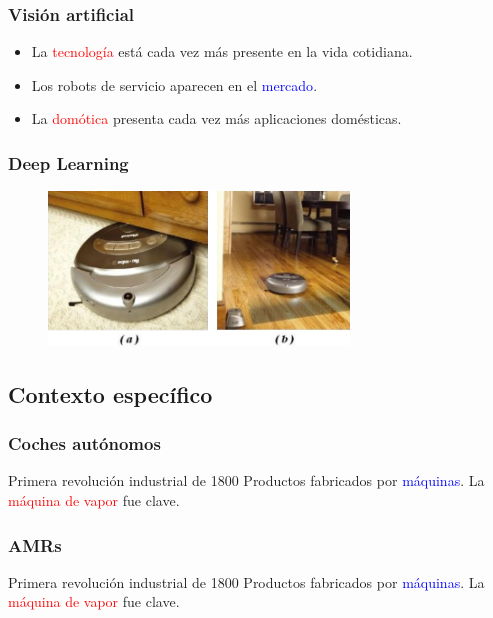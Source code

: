 \documentclass{beamer}
\begin{document}
\begin{frame}
	\frametitle{Visión artificial}
	\begin{itemize}
	\item La \textcolor{red}{tecnología} está cada vez más presente en la vida cotidiana.
	\item Los robots de servicio aparecen en el \textcolor{blue}{mercado}.
	\item La \textcolor{red}{domótica} presenta cada vez más aplicaciones domésticas.
	\end{itemize}
\end{frame}

\begin{frame}
	\frametitle{Deep Learning}
	\begin{figure}
	\centering
	\includegraphics[width=8cm]{figs/roomba}
	\end{figure}
\end{frame}

\subsection{Contexto específico}
\begin{frame}
	\frametitle{Coches autónomos}
	\begin{block}{Primera revolución industrial de 1800}
	Productos fabricados por \textcolor{blue}{máquinas}. La \textcolor{red}{máquina de vapor} fue clave.
	\end{block}
\end{frame}

\begin{frame}
	\frametitle{AMRs}
	\begin{block}{Primera revolución industrial de 1800}
	Productos fabricados por \textcolor{blue}{máquinas}. La \textcolor{red}{máquina de vapor} fue clave.
	\end{block}
\end{frame}

\end{document}
